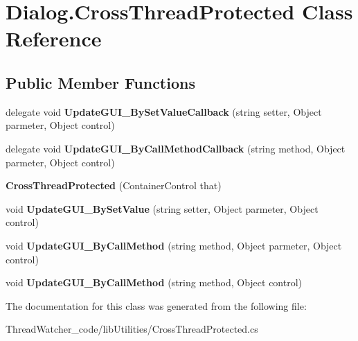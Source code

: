 \hypertarget{class_dialog_1_1_cross_thread_protected}{\section{Dialog.\+Cross\+Thread\+Protected Class Reference}
\label{class_dialog_1_1_cross_thread_protected}
}
\subsection*{Public Member Functions}
\begin{DoxyCompactItemize}
\item 
\hypertarget{class_dialog_1_1_cross_thread_protected_aeb4a7f108dfbeac51f116a31d2a0cf33}{delegate void {\bfseries Update\+G\+U\+I\+\_\+\+By\+Set\+Value\+Callback} (string setter, Object parmeter, Object control)}\label{class_dialog_1_1_cross_thread_protected_aeb4a7f108dfbeac51f116a31d2a0cf33}

\item 
\hypertarget{class_dialog_1_1_cross_thread_protected_a1251b93ed8c1ef863fb68773134b085a}{delegate void {\bfseries Update\+G\+U\+I\+\_\+\+By\+Call\+Method\+Callback} (string method, Object parmeter, Object control)}\label{class_dialog_1_1_cross_thread_protected_a1251b93ed8c1ef863fb68773134b085a}

\item 
\hypertarget{class_dialog_1_1_cross_thread_protected_a0a92e1cb5752536655165a83cac801a8}{{\bfseries Cross\+Thread\+Protected} (Container\+Control that)}\label{class_dialog_1_1_cross_thread_protected_a0a92e1cb5752536655165a83cac801a8}

\item 
\hypertarget{class_dialog_1_1_cross_thread_protected_a1a3ab563bc34b1963fe0136bbb8992bb}{void {\bfseries Update\+G\+U\+I\+\_\+\+By\+Set\+Value} (string setter, Object parmeter, Object control)}\label{class_dialog_1_1_cross_thread_protected_a1a3ab563bc34b1963fe0136bbb8992bb}

\item 
\hypertarget{class_dialog_1_1_cross_thread_protected_a7e3c30acf1b481f0dc4c1208d2423c63}{void {\bfseries Update\+G\+U\+I\+\_\+\+By\+Call\+Method} (string method, Object parmeter, Object control)}\label{class_dialog_1_1_cross_thread_protected_a7e3c30acf1b481f0dc4c1208d2423c63}

\item 
\hypertarget{class_dialog_1_1_cross_thread_protected_ad0961cb01fc589ba42b312e7e45b139d}{void {\bfseries Update\+G\+U\+I\+\_\+\+By\+Call\+Method} (string method, Object control)}\label{class_dialog_1_1_cross_thread_protected_ad0961cb01fc589ba42b312e7e45b139d}

\end{DoxyCompactItemize}


The documentation for this class was generated from the following file\+:\begin{DoxyCompactItemize}
\item 
Thread\+Watcher\+\_\+code/lib\+Utilities/Cross\+Thread\+Protected.\+cs\end{DoxyCompactItemize}
